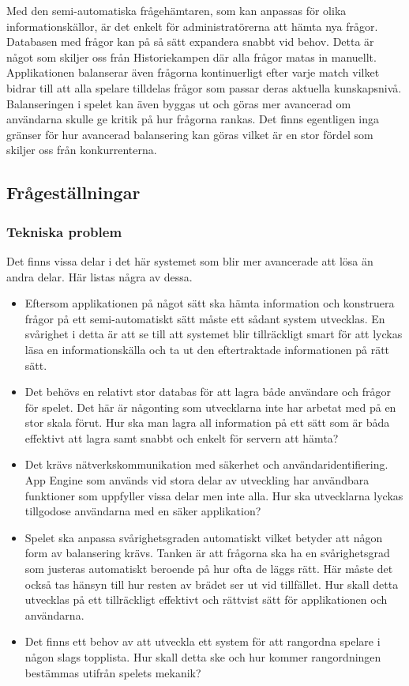 \documentclass[a4paper, 11pt]{article}
\begin{document}
Med den semi-automatiska frågehämtaren, som kan anpassas för olika informationskällor, är det enkelt för administratörerna att hämta nya frågor. Databasen med frågor kan på så sätt expandera snabbt vid behov. Detta är något som skiljer oss från Historiekampen där alla frågor matas in manuellt. \\
Applikationen balanserar även frågorna kontinuerligt efter varje match vilket bidrar till att alla spelare tilldelas frågor som passar deras aktuella kunskapsnivå. Balanseringen i spelet kan även byggas ut och göras mer avancerad om användarna skulle ge kritik på hur frågorna rankas. Det finns egentligen inga gränser för hur avancerad balansering kan göras vilket är en stor fördel som skiljer oss från konkurrenterna.

\subsection{Frågeställningar}

\subsubsection{Tekniska problem}
Det finns vissa delar i det här systemet som blir mer avancerade att lösa än andra delar. Här listas några av dessa.
\begin{itemize}
\item Eftersom applikationen på något sätt ska hämta information och konstruera frågor på ett semi-automatiskt sätt måste ett sådant system utvecklas. En svårighet i detta är att se till att systemet blir tillräckligt smart för att lyckas läsa en informationskälla och ta ut den eftertraktade informationen på rätt sätt.
\item Det behövs en relativt stor databas för att lagra både användare och frågor för spelet. Det här är någonting som utvecklarna inte har arbetat med på en stor skala förut. Hur ska man lagra all information på ett sätt som är båda effektivt att lagra samt snabbt och enkelt för servern att hämta?
\item Det krävs nätverkskommunikation med säkerhet och användaridentifiering. App Engine som används vid stora delar av utveckling har användbara funktioner som uppfyller vissa delar men inte alla. Hur ska utvecklarna lyckas tillgodose användarna med en säker applikation?
\item Spelet ska anpassa svårighetsgraden automatiskt vilket betyder att någon form av balansering krävs. Tanken är att frågorna ska ha en svårighetsgrad som justeras automatiskt beroende på hur ofta de läggs rätt. Här måste det också tas hänsyn till hur resten av brädet ser ut vid tillfället. Hur skall detta utvecklas på ett tillräckligt effektivt och rättvist sätt för applikationen och användarna.
\item Det finns ett behov av att utveckla ett system för att rangordna spelare i någon slags topplista. Hur skall detta ske och hur kommer rangordningen bestämmas utifrån spelets mekanik? 
\end{itemize}
\end{document}
